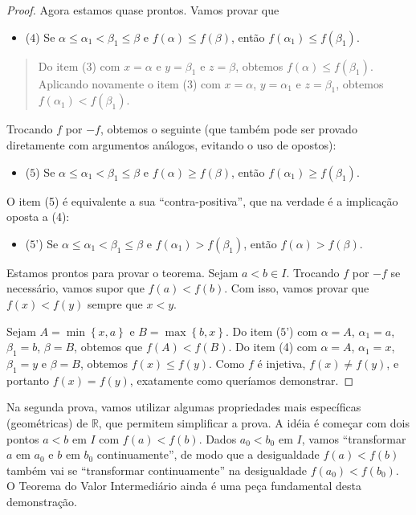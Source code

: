 \begin{proof}
	Agora estamos quase prontos. Vamos provar que
	
	\begin{itemize}
		\item ($4$) Se $\alpha\leq \alpha_1<\beta_1\leq \beta$ e $f(\alpha)\leq f(\beta)$, então $f(\alpha_1)\leq f(\beta_1)$.
	\end{itemize}
	
	\begin{quote}
		Do item (3) com $x=\alpha$ e $y=\beta_1$ e $z=\beta$, obtemos $f(\alpha)\leq f(\beta_1)$. Aplicando novamente o item (3) com $x=\alpha$, $y=\alpha_1$ e $z=\beta_1$, obtemos $f(\alpha_1)<f(\beta_1)$.
	\end{quote}
	
	Trocando $f$ por $-f$, obtemos o seguinte (que também pode ser provado diretamente com argumentos análogos, evitando o uso de opostos):
	
	\begin{itemize}
		\item ($5$) Se $\alpha\leq \alpha_1<\beta_1\leq\beta$ e $f(\alpha)\geq f(\beta)$, então $f(\alpha_1)\geq f(\beta_1)$.
	\end{itemize}
	
	O item (5) é equivalente a sua ``contra-positiva'', que na verdade é a implicação oposta a (4):
	\begin{itemize}
		\item ($5$') Se $\alpha\leq \alpha_1<\beta_1\leq \beta$ e $f(\alpha_1)> f(\beta_1)$, então $f(\alpha)>f(\beta)$.
	\end{itemize}
	
	Estamos prontos para provar o teorema. Sejam $a<b\in I$. Trocando $f$ por $-f$ se necessário, vamos supor que $f(a)< f(b)$. Com isso, vamos provar que $f(x)<f(y)$ sempre que $x<y$.
	
	Sejam $A=\min\left\{x,a\right\}$ e $B=\max\left\{b,x\right\}$. Do item ($5$') com $\alpha=A$, $\alpha_1=a$, $\beta_1=b$, $\beta=B$, obtemos que $f(A)<f(B)$. Do item (4) com $\alpha=A$, $\alpha_1=x$, $\beta_1=y$ e $\beta=B$, obtemos $f(x)\leq f(y)$. Como $f$ é injetiva, $f(x)\neq f(y)$, e portanto $f(x)=f(y)$, exatamente como queríamos demonstrar.
\end{proof}

Na segunda prova, vamos utilizar algumas propriedades mais específicas (geométricas) de $\mathbb{R}$, que permitem simplificar a prova. A idéia é começar com dois pontos $a<b$ em $I$ com $f(a)<f(b)$. Dados $a_0<b_0$ em $I$, vamos ``transformar $a$ em $a_0$ e $b$ em $b_0$ continuamente'', de modo que a desigualdade $f(a)<f(b)$ também vai se ``transformar continuamente'' na desigualdade $f(a_0)<f(b_0)$. O Teorema do Valor Intermediário ainda é uma peça fundamental desta demonstração.

